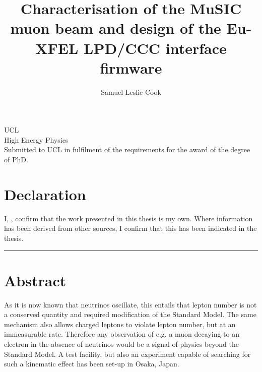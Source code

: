 \documentclass[12pt]{book}
\title{Characterisation of the MuSIC muon beam and design of the Eu-XFEL LPD/CCC interface firmware}
\author{Samuel Leslie Cook}
\begin{document}
    

    \begin{titlepage}
      \begin{center}
        \vspace*{3cm}
        
        \huge
        \textbf{\thetitle}

        \vspace{2cm}

        \textbf{\theauthor}

        \vfill
        \large
        UCL\\
        \vspace{0.8cm}
        High Energy Physics\\
        \vspace{0.8cm}
        Submitted to UCL in fulfilment of the requirements for the award of the degree of PhD.

      \end{center}
    \end{titlepage}
    
    \chapter*{Declaration} %
      I, \theauthor, confirm that the work presented in this thesis is my own.
      Where information has been derived from other sources, I confirm that
      this has been indicated in the thesis.
      \vspace*{3cm}
      \begin{flushright}
      \theauthor\hspace*{0.1\textwidth}\rule{0.5\textwidth}{0.25pt}
      \end{flushright}
    
    \chapter*{Abstract} %
      As it is now known that neutrinos oscillate, this entails that lepton number is not a conserved quantity and required modification of the Standard Model.  The same mechanism also allows charged leptons to violate lepton number, but at an immeasurable rate.  Therefore any observation of e.g. a muon decaying to an electron in the absence of neutrinos would be a signal of physics beyond the Standard Model.  A test facility, but also an experiment capable of searching for such a kinematic effect has been set-up in Osaka, Japan.
\end{document}
